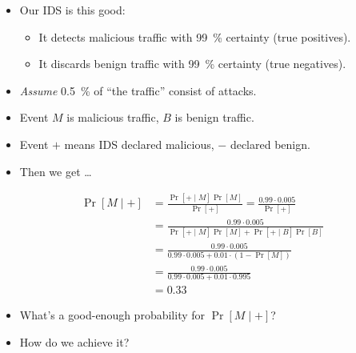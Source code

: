 \begin{frame}
  \begin{example}
    \begin{itemize}
      \item Our IDS is this good:
        \begin{itemize}
          \item It detects malicious traffic with \SI{99}{\percent} certainty 
            (true positives).
          \item It discards benign traffic with \SI{99}{\percent} certainty 
            (true negatives).
        \end{itemize}

        \pause{}

      \item \emph{Assume} \SI{0.5}{\percent} of \enquote{the traffic} consist 
        of attacks.

        \pause{}

      \item Event \(M\) is malicious traffic, \(B\) is benign traffic.
      \item Event \(+\) means IDS declared malicious, \(-\) declared benign.

        \pause{}

      \item Then we get \dots
    \end{itemize}
  \end{example}
\end{frame}

\begin{frame}
  \begin{example}
    \begin{align*}
      \Pr[M\mid +] &= \frac{\Pr[+\mid M] \Pr[M]}{\Pr[+]}
      = \frac{0.99\cdot 0.005}{\Pr[+]} \\
      &= \frac{0.99\cdot 0.005}{\Pr[+\mid M] \Pr[M] + \Pr[+\mid B] \Pr[B]} 
      \\
      &= \frac{0.99\cdot 0.005}{0.99\cdot 0.005 + 0.01\cdot (1 - \Pr[M])} 
      \\
      &= \frac{0.99\cdot 0.005}{0.99\cdot 0.005 + 0.01\cdot 0.995} \\
      &= 0.33
    \end{align*}
  \end{example}
\end{frame}

\begin{frame}
  \begin{exercise}
    \begin{itemize}
      \item What's a good-enough probability for \(\Pr[M\mid +]\)?
      \item How do we achieve it?
    \end{itemize}
  \end{exercise}
\end{frame}


